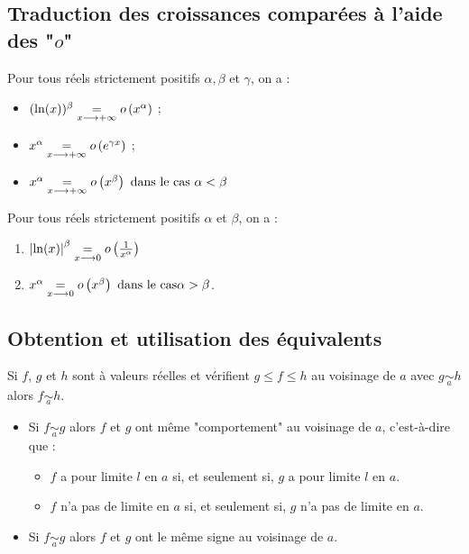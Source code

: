 \subsection{Traduction des croissances comparées à l’aide des "\(o\)"}

\begin{defprop}
    Pour tous réels strictement positifs \(\alpha, \beta\) et \(\gamma\), on a :
    \begin{itemize}
        \item \((\ln(x))^{\beta} \underset{x\longrightarrow +\infty}{=}o \left(x^{\alpha}\right)\) ;
        \item \(x^{\alpha} \underset{x\longrightarrow +\infty}{=} o \left(e^{\gamma x}\right)\) ;
        \item \( x^{\alpha} \underset{x\longrightarrow +\infty}{=} o \left( x^{\beta}\right) \text{ dans le cas } \alpha < \beta\)
    \end{itemize}


\end{defprop}

\begin{defprop}[Au voisinage de \(0\)]
    Pour tous réels strictement positifs \(\alpha\) et \(\beta\), on a :
    \begin{enumerate}
        \item \(\left\lvert\ln(x)\right\rvert^{\beta} \underset{x\longrightarrow 0}{=} o \left(\frac{1}{x^{\alpha}}\right)\)
        \item \(x^{\alpha} \underset{x\longrightarrow 0}{=} o\left( x^{\beta}\right) \text{ dans le cas} \alpha > \beta\).
    \end{enumerate}
\end{defprop}

\subsection{Obtention et utilisation des équivalents}

\begin{defprop}
    Si \(f\), \(g\) et \(h\) sont à valeurs réelles et vérifient \(g \leq f \leq h\) au voisinage de \(a\) avec \( g \underset{a}{\sim} h \) alors \( f \underset{a}{\sim} h \).
\end{defprop}

\begin{defprop}
    \begin{itemize}
        \item Si \(f\underset{a}{\sim} g\) alors \(f\) et \(g\) ont même "comportement" au voisinage de \(a\), c’est-à-dire que :
        \begin{itemize}
            \item \(f\) a pour limite \(l\) en \(a\) si, et seulement si, \(g\) a pour limite \(l\) en \(a\).
            \item \(f\) n’a pas de limite en \(a\) si, et seulement si, \(g\) n’a pas de limite en \(a\).
        \end{itemize}
        \item Si \(f \underset{a}{\sim} g\) alors \(f\) et \(g\) ont le même signe au voisinage de \(a\).
    \end{itemize}
\end{defprop}


